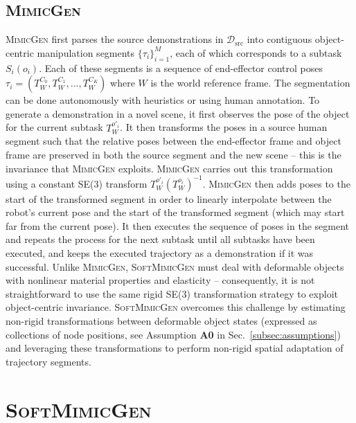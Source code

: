 \documentclass[letterpaper, 10 pt, conference]{ieeeconf}  %
\newcommand{\sysName}{\textsc{SoftMimicGen}\xspace}
\newcommand{\MimicGen}{\textsc{MimicGen}\xspace}
\begin{document}
\subsection{\MimicGen}
\label{subsec:mimicgen}


\MimicGen first parses the source demonstrations in $\mathcal{D}_{\text{src}}$ into contiguous object-centric manipulation segments $\{\tau_i\}_{i=1}^M$, each of which corresponds to a subtask $S_i(o_i)$. Each of these segments is a sequence of end-effector control poses $\tau_i = (T^{C_0}_W, T^{C_1}_W, ..., T^{C_K}_W)$ where $W$ is the world reference frame. The segmentation can be done autonomously with heuristics or using human annotation. To generate a demonstration in a novel scene, it first observes the pose of the object for the current subtask $T^{o'_i}_{W}$. It then transforms the poses in a source human segment such that the relative poses between the end-effector frame and object frame are preserved in both the source segment and the new scene -- this is the invariance that \MimicGen exploits. \MimicGen carries out this transformation using a constant SE(3) transform $T^{o'_i}_{W}(T^{o_i}_{W})^{-1}$. \MimicGen then adds poses to the start of the transformed segment in order to linearly interpolate between the robot's current pose and the start of the transformed segment (which may start far from the current pose). It then executes the sequence of poses in the segment and repeats the process for the next subtask until all subtasks have been executed, and keeps the executed trajectory as a demonstration if it was successful. Unlike \MimicGen, \sysName must deal with deformable objects with nonlinear material properties and elasticity -- consequently, it is not straightforward to use the same rigid SE(3) transformation strategy to exploit object-centric invariance. \sysName overcomes this challenge by estimating non-rigid transformations between deformable object states (expressed as collections of node positions, see Assumption \textbf{A0} in Sec.~\ref{subsec:assumptions}) and leveraging these transformations to perform non-rigid spatial adaptation of trajectory segments.





\section{\sysName}
\end{document}
